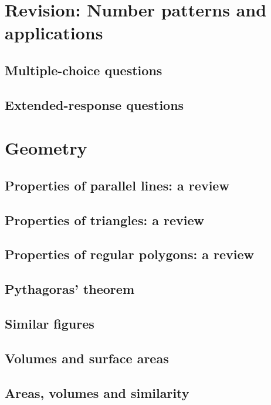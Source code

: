 \documentclass[a4paper,11pt]{article}
\begin{document}
\newpage

\section{Revision: Number patterns and applications}
\begin{outline}

\0
\subsection{Multiple-choice questions}

\0
\subsection{Extended-response questions}

\end{outline}

\newpage

\section{Geometry}
\begin{outline}

\0
\subsection{Properties of parallel lines: a review}

\0
\subsection{Properties of triangles: a review}

\0
\subsection{Properties of regular polygons: a review}

\0
\subsection{Pythagoras' theorem}

\0
\subsection{Similar figures}

\0
\subsection{Volumes and surface areas}

\0
\subsection{Areas, volumes and similarity}

\end{outline}
\end{document}
